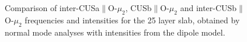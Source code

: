 \documentclass[11pt,DIV=13,BCOR=5mm,a4paper,headinclude]{scrbook}
\begin{document}
\begin{figure}[!h]
             \quad
             \quad
             \quad
             \caption{Comparison of inter-CUSa$\parallel$O-$\mu_2$, CUSb$\parallel$O-$\mu_2$ and inter-CUSb$\parallel$O-$\mu_2$ frequencies and intensities for the 25 layer slab, obtained by normal mode analyses with intensities from the dipole model.}
            \label{abb:iCa2+Cb2+iCb2_25_comp} %
\end{figure}
\end{document}

